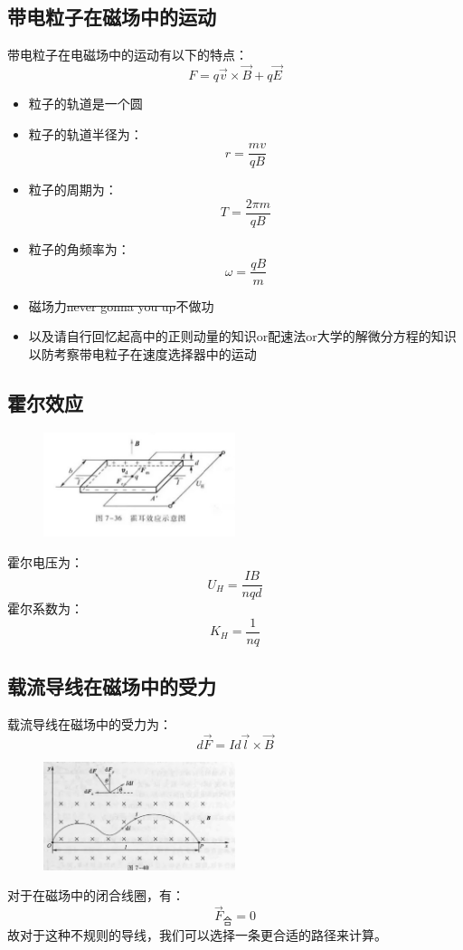 \documentclass{ctexart}
\begin{document}
\subsection{带电粒子在磁场中的运动}
带电粒子在电磁场中的运动有以下的特点：
$$
    F = q\vec{v} \times \vec{B} + q \vec{E}
$$
\begin{itemize}
    \item 粒子的轨道是一个圆
    \item 粒子的轨道半径为：
    $$
        r = \frac{mv}{qB}
    $$
    \item 粒子的周期为：
    $$
        T = \frac{2\pi m}{qB}
    $$
    \item 粒子的角频率为：
    $$
        \omega = \frac{qB}{m}
    $$
    \item 磁场力\sout{never gonna you up}不做功
    \item 以及请自行回忆起高中的正则动量的知识or配速法or大学的解微分方程的知识 以防考察带电粒子在速度选择器中的运动
\end{itemize}
\subsection{霍尔效应}
\begin{figure}[H]
    \centering
    \includegraphics[width=0.5\textwidth]{img/7-36.jpg}
\end{figure}
霍尔电压为：
$$
    U_H = \frac{IB}{nqd}
$$
霍尔系数为：
$$
    K_H = \frac{1}{nq}
$$
\subsection{载流导线在磁场中的受力}
载流导线在磁场中的受力为：
$$
    d\vec{F} = I d\vec{l} \times \vec{B}
$$
\begin{figure}[H]
    \centering
    \includegraphics[width=0.5\textwidth]{img/7-40.jpg}
\end{figure}
对于在磁场中的闭合线圈，有：
$$
    \vec{F}_{\text{合}} = 0
$$
故对于这种不规则的导线，我们可以选择一条更合适的路径来计算。
\end{document}
